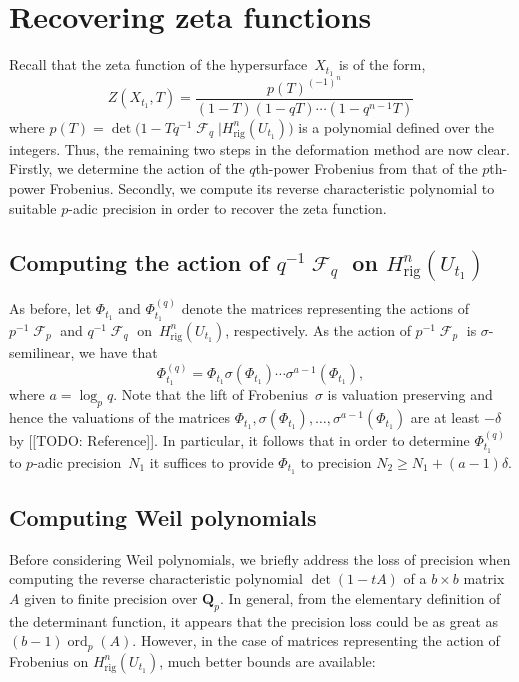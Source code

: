 \documentclass[a4paper,11pt]{article}
\numberwithin{equation}{section}
\DeclareMathOperator{\ord}{ord}          %
\DeclareMathOperator{\Frob}{\mathcal{F}} %
\providecommand{\Hrig}{H_{\text{rig}}}  %
\theoremstyle{definition}
\begin{document}

\section{Recovering zeta functions}
\label{sec:ZetaFunctions}

Recall that the zeta function of the hypersurface~$X_{t_1}$ is of the form,
\begin{equation}
Z(X_{t_1},T) = \frac{p(T)^{(-1)^n}}{(1 - T) (1 - qT) \dotsm (1 - q^{n-1}T)}
\end{equation}
where $p(T) = \det \bigl( 1 - T q^{-1} \Frob_q | \Hrig^n(U_{t_1}) \bigr)$ 
is a polynomial defined over the integers.
Thus, the remaining two steps in the deformation method are now clear.  
Firstly, we determine the action of the $q$th-power Frobenius 
from that of the $p$th-power Frobenius.  Secondly, we compute 
its reverse characteristic polynomial to suitable \mbox{$p$-adic} 
precision in order to recover the zeta function.

\subsection{Computing the action of $q^{-1} \Frob_q$ on $\Hrig^{n}(U_{t_1})$}

As before, let $\Phi_{t_1}$ and $\Phi_{t_1}^{(q)}$ denote the matrices 
representing the actions of $p^{-1} \Frob_p$ and $q^{-1} \Frob_q$ 
on~$\Hrig^{n}(U_{t_1})$, respectively.  As the action of $p^{-1} \Frob_p$ 
is $\sigma$-semilinear, we have that 
\begin{equation}
\Phi_{t_1}^{(q)} = 
    \Phi_{t_1} \sigma(\Phi_{t_1}) \dotsm \sigma^{a-1}(\Phi_{t_1}),
\end{equation}
where $a = \log_p q$.  Note that the lift of Frobenius~$\sigma$ 
is valuation preserving and hence the valuations of the matrices 
$\Phi_{t_1}, \sigma(\Phi_{t_1}), \dotsc, \sigma^{a-1}(\Phi_{t_1})$ 
are at least $-\delta$ by [[TODO: Reference]].
In particular, it follows that in order to determine $\Phi_{t_1}^{(q)}$ 
to $p$-adic precision~$N_1$ it suffices to provide $\Phi_{t_1}$ to 
precision $N_2 \geq N_1 + (a-1) \delta$.

\subsection{Computing Weil polynomials}

Before considering Weil polynomials, we briefly address the loss 
of precision when computing the reverse characteristic polynomial 
$\det(1 - t A)$ of a $b \times b$ matrix~$A$ given to finite precision 
over $\mathbf{Q}_p$.  In general, from the elementary definition of the 
determinant function, it appears that the precision loss could be as 
great as $(b-1) \ord_p(A)$.  However, in the case of matrices representing 
the action of Frobenius on $\Hrig^n(U_{t_1})$, much better bounds are 
available:
\end{document}
